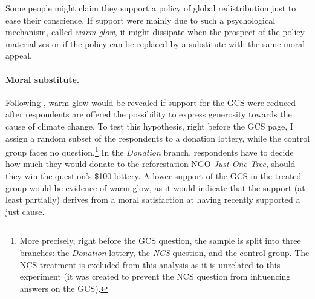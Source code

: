 \documentclass[12pt,english]{article}
\begin{document}
\begin{bibunit}
Some people might claim they support a policy of global redistribution just to ease their conscience. If support were mainly due to such a psychological mechanism, called \textit{warm glow}, it might
dissipate when the prospect of the policy materializes or if the policy can be replaced by a substitute with the same moral appeal.

\paragraph{Moral substitute.}

Following \cite{nunes_identifying_2003}, warm glow would be revealed if support for the GCS were reduced after respondents are offered the possibility to express generosity towards the cause of climate change. To test this hypothesis, right before the GCS page, I assign a random subset of the respondents to a donation lottery, while the control group faces no question.\footnote{More precisely, right before the GCS question, the sample is split into three branches: the \textit{Donation} lottery, the \textit{NCS} question, and the control group. The NCS treatment is excluded from this analysis as it is unrelated to this experiment (it was created to prevent the NCS question from influencing answers on the GCS).} 
In the \textit{Donation} branch, respondents have to decide how much they would donate to the reforestation NGO \textit{Just One Tree}, should they win the question's \$100 lottery. 
A lower support of the GCS in the treated group would be evidence of warm glow, as it would indicate that the support (at least partially) derives from a moral satisfaction at having recently supported a just cause. 


\end{bibunit}
\end{document}

